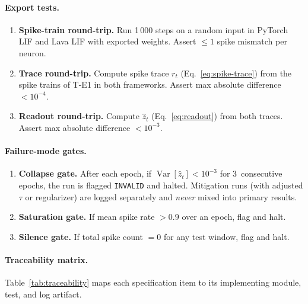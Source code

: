 \documentclass[11pt,a4paper]{article}
\begin{document}
\paragraph{Export tests.}
\begin{enumerate}[nosep,label=\textbf{T-E\arabic*.}]
\item \textbf{Spike-train round-trip.}
  Run 1\,000 steps on a random input in PyTorch LIF and Lava LIF with
  exported weights.  Assert $\leq 1$ spike mismatch per neuron.
\item \textbf{Trace round-trip.}
  Compute spike trace $r_t$ (Eq.~\ref{eq:spike-trace}) from the spike
  trains of T-E1 in both frameworks.  Assert max absolute difference
  $< 10^{-4}$.
\item \textbf{Readout round-trip.}
  Compute $\hat{z}_t$ (Eq.~\ref{eq:readout}) from both traces.  Assert
  max absolute difference $< 10^{-3}$.
\end{enumerate}

\paragraph{Failure-mode gates.}
\begin{enumerate}[nosep,label=\textbf{T-F\arabic*.}]
\item \textbf{Collapse gate.}
  After each epoch, if $\operatorname{Var}[\hat{z}_t] < 10^{-3}$ for
  3~consecutive epochs, the run is flagged \texttt{INVALID} and halted.
  Mitigation runs (with adjusted $\tau$ or regularizer) are logged
  separately and \emph{never} mixed into primary results.
\item \textbf{Saturation gate.}
  If mean spike rate $> 0.9$ over an epoch, flag and halt.
\item \textbf{Silence gate.}
  If total spike count $= 0$ for any test window, flag and halt.
\end{enumerate}

\paragraph{Traceability matrix.}
Table~\ref{tab:traceability} maps each specification item to its
implementing module, test, and log artifact.
\end{document}

